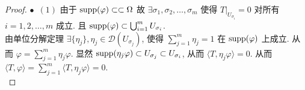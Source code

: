 \documentclass[11pt]{ctexart}[UTF8]
\begin{document}
\begin{proof}
    $\bullet$\  $(1)$ 由于 $\operatorname{supp}(\varphi) \subset\subset \Omega$ 故 $\exists \sigma_{1},\sigma_{2},\ldots,\sigma_{m}$ 使得
    $T\big|_{U_{\sigma_i}} = 0$ 对所有 $i = 1, 2, \ldots, m$ 成立. 且 $\operatorname{supp}(\varphi) \subset \bigcup_{i=1}^m U_{\sigma_i}$.\\
    由单位分解定理 $\exists \{ \eta_{j} \}, \eta_{j} \in \mathscr{D}(U_{\sigma_j})$, 使得 $\sum\limits_{j=1}^m \eta_{j} = 1$ 在 $\operatorname{supp}(\varphi)$ 上成立. 
    从而 $\varphi = \sum\limits_{j=1}^m \eta_{j} \varphi$. 显然 $\operatorname{supp}(\eta_{j} \varphi) \subset U_{\sigma_j}\subset U_{\sigma_i}$, 
    从而 $\langle T, \eta_{j} \varphi \rangle = 0$. 从而 $\langle T, \varphi \rangle = \sum\limits_{j=1}^{m} \langle T, \eta_{j} \varphi \rangle = 0$.\\


\end{proof}
\end{document}
